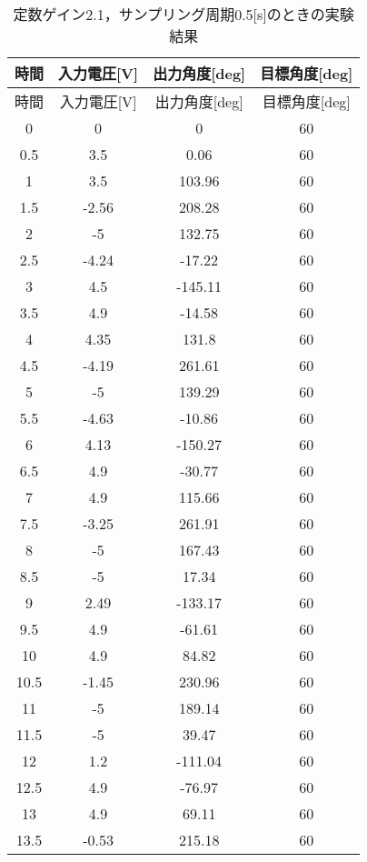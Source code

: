 \begin{longtable}[c]{|c|c|c|c|}
  \caption{定数ゲイン2.1，サンプリング周期0.5[s]のときの実験結果}
  \label{tab7} \\
  \hline
   時間& 	入力電圧[V]&	出力角度[deg]&	目標角度[deg] \\ \hline \hline \endfirsthead 
\hline \endhead
\hline \endfoot
\hline \endlastfoot
時間& 	入力電圧[V]&    出力角度[deg]&	目標角度[deg] \\ \hline
0   & 	0     &	0      &60 \\ \hline 
0.5 &	3.5   &	0.06   &60 \\ \hline 
1   &	3.5   &	103.96 &60 \\ \hline 
1.5 &	-2.56 &	208.28 &60 \\ \hline 
2   &	-5    &	132.75 &60 \\ \hline 
2.5 &	-4.24 &	-17.22 &60 \\ \hline 
3   &	4.5   &	-145.11&60 \\ \hline 
3.5 &	4.9   &	-14.58 &60 \\ \hline 
4   &	4.35  &	131.8  &60 \\ \hline 
4.5 &	-4.19 &	261.61 &60 \\ \hline 
5   &	-5    &	139.29 &60 \\ \hline 
5.5 &	-4.63 &	-10.86 &60 \\ \hline 
6   &	4.13  &	-150.27&60 \\ \hline 
6.5 &	4.9   &	-30.77 &60 \\ \hline 
7   &	4.9   &	115.66 &60 \\ \hline 
7.5 &	-3.25 &	261.91 &60 \\ \hline 
8   &	-5    &	167.43 &60 \\ \hline 
8.5 &	-5    &	17.34  &60 \\ \hline 
9   &	2.49  &	-133.17&60 \\ \hline 
9.5 &	4.9   &	-61.61 &60 \\ \hline 
10  &	4.9   &	84.82  &60 \\ \hline 
10.5&	-1.45 &	230.96 &60 \\ \hline 
11  &	-5    &	189.14 &60 \\ \hline 
11.5&	-5    &	39.47  &60 \\ \hline 
12  &	1.2   &	-111.04&60 \\ \hline 
12.5&	4.9   &	-76.97 &60 \\ \hline 
13  &	4.9   &	69.11  &60 \\ \hline 
13.5&	-0.53 &	215.18 &60 \\ \hline 

\end{longtable}
